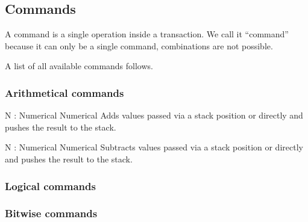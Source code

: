 \subsection{Commands}

A command is a single operation inside a transaction. We call it ``command''
because it can only be a single command, combinations are not possible.

A list of all available commands follows.

\subsubsection{Arithmetical commands}

    \begin{commands}

                {N : Numerical}
                {Numerical}
                {
                    Adds values passed via a stack position or directly and
                    pushes the result to the stack.
                }

                {N : Numerical}
                {Numerical}
                {
                    Subtracts values passed via a stack position or directly
                    and pushes the result to the stack.
                }

    \end{commands}

\subsubsection{Logical commands}


\subsubsection{Bitwise commands}



